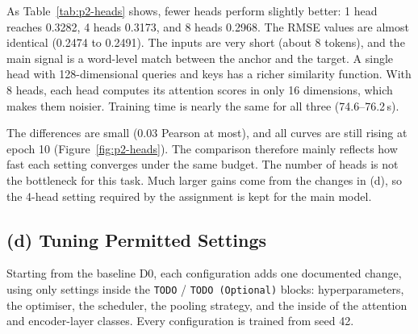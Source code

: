 \documentclass[11pt,a4paper]{article}
\begin{document}
As Table~\ref{tab:p2-heads} shows, fewer heads perform slightly better:
1 head reaches 0.3282, 4 heads 0.3173, and 8 heads 0.2968. The RMSE
values are almost identical (0.2474 to 0.2491). The inputs are very
short (about 8 tokens), and the main signal is a word-level match
between the anchor and the target. A single head with 128-dimensional
queries and keys has a richer similarity function. With 8 heads, each
head computes its attention scores in only 16 dimensions, which makes
them noisier. Training time is nearly the same for all three
(74.6--76.2\,s).

The differences are small (0.03 Pearson at most), and all curves are
still rising at epoch 10 (Figure~\ref{fig:p2-heads}). The comparison
therefore mainly reflects how fast each setting converges under the same
budget. The number of heads is not the bottleneck for this task. Much
larger gains come from the changes in (d), so the 4-head setting
required by the assignment is kept for the main model.


\subsection{(d) Tuning Permitted Settings}

Starting from the baseline D0, each configuration adds one documented
change, using only settings inside the \texttt{TODO} /
\texttt{TODO (Optional)} blocks: hyperparameters, the optimiser, the
scheduler, the pooling strategy, and the inside of the attention and
encoder-layer classes. Every configuration is trained from seed 42.
\end{document}
